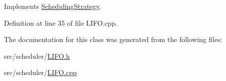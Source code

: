 Implements \hyperlink{class_scheduling_strategy_a62ffa0426528c14fdd0b0853f04a851f}{Scheduling\+Strategy}.



Definition at line 35 of file L\+I\+F\+O.\+cpp.



The documentation for this class was generated from the following files\+:\begin{DoxyCompactItemize}
\item 
src/scheduler/\hyperlink{_l_i_f_o_8h}{L\+I\+F\+O.\+h}\item 
src/scheduler/\hyperlink{_l_i_f_o_8cpp}{L\+I\+F\+O.\+cpp}\end{DoxyCompactItemize}
